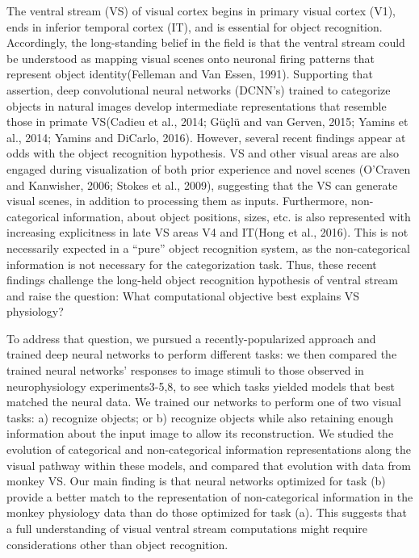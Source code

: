 \documentclass{templates/ucdenverthesis}
\begin{document}
The ventral stream (VS) of visual cortex begins in primary visual cortex (V1), ends in inferior temporal cortex (IT), and is essential for object recognition.
Accordingly, the long-standing belief in the field is that the ventral stream could be understood as mapping visual scenes onto neuronal firing patterns that represent object identity(Felleman and Van Essen, 1991).
Supporting that assertion, deep convolutional neural networks (DCNN's) trained to categorize objects in natural images develop intermediate representations that resemble those in primate VS(Cadieu et al., 2014; Güçlü and van Gerven, 2015; Yamins et al., 2014; Yamins and DiCarlo, 2016).
However, several recent findings appear at odds with the object recognition hypothesis.
VS and other visual areas are also engaged during visualization of both prior experience and novel scenes (O'Craven and Kanwisher, 2006; Stokes et al., 2009), suggesting that the VS can generate visual scenes, in addition to processing them as inputs. Furthermore, non-categorical information, about object positions, sizes, etc. is also represented with increasing explicitness in late VS areas V4 and IT(Hong et al., 2016).
This is not necessarily expected in a ``pure'' object recognition system, as the non-categorical information is not necessary for the categorization task. Thus, these recent findings challenge the long-held object recognition hypothesis of ventral stream and raise the question: What computational objective best explains VS physiology? \autocite{Richards}

To address that question, we pursued a recently-popularized approach and trained deep neural networks to perform different tasks: we then compared the trained neural networks' responses to image stimuli to those observed in neurophysiology experiments3-5,8, to see which tasks yielded models that best matched the neural data. We trained our networks to perform one of two visual tasks: a) recognize objects; or b) recognize objects while also retaining enough information about the input image to allow its reconstruction. We studied the evolution of categorical and non-categorical information representations along the visual pathway within these models, and compared that evolution with data from monkey VS. Our main finding is that neural networks optimized for task (b) provide a better match to the representation of non-categorical information in the monkey physiology data than do those optimized for task (a). This suggests that a full understanding of visual ventral stream computations might require considerations other than object recognition.
\end{document}
